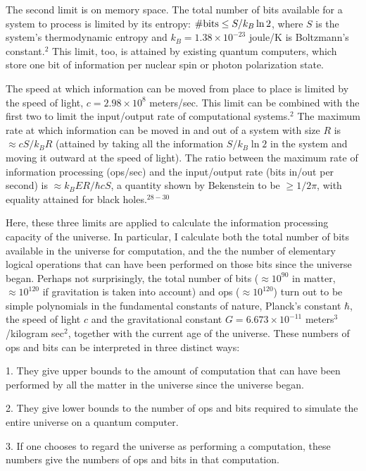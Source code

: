 The second limit is on memory space.  The total number of bits available 
for a system to process is limited by its entropy:
${\rm \# bits} \leq S/k_B \ln 2$, where $S$ is the system's
thermodynamic entropy and $k_B = 1.38 \times 10^{-23}$ joule/K
is Boltzmann's constant.$^2$  This limit, too, is attained by existing quantum
computers, which store one bit of information per nuclear spin or
photon polarization state.


The speed at which information can be moved from place to place
is limited by the speed of light, $c= 2.98 \times 10^8$ meters/sec.
This limit can be combined with the first two to limit the input/output
rate of computational systems.$^2$  The maximum rate at which information
can be moved in and out of a system with size $R$ is 
$\approx cS/k_B R$ (attained by taking all the information $S/k_B\ln2$ in the
system and moving it outward at the speed of light).  The ratio between
the maximum rate of information processing (ops/sec) and the
input/output rate (bits in/out per second) is $\approx k_B E R/ \hbar c S$,
a quantity shown by Bekenstein to be $\geq 1/2\pi$, with equality attained
for black holes.$^{28-30}$

Here, these three limits are applied to calculate the information processing
capacity of the universe.  In particular, I calculate both the total number
of bits available in the universe for computation, and the the number 
of elementary logical operations that can have been performed on those bits
since the universe began.  Perhaps not surprisingly, the total number of
bits ($ \approx 10^{90}$ in matter, $\approx 10^{120}$ if gravitation
is taken into account) and ops ($ \approx 10^{120}$) turn out to 
be simple polynomials in 
the fundamental constants of nature, Planck's constant $\hbar$, the speed 
of light $c$ and the gravitational constant $G=6.673 \times 10^{-11}$ 
meters$^3$/kilogram sec$^2$, together with the current age of the
universe.  These numbers of ops and bits can be interpreted in three
distinct ways:
\bigskip

\item{1.} They give upper bounds to the amount of computation
that can have been performed by all the matter in the universe since the
universe began.

\item{2.} They give lower bounds to the number of ops and
bits required to simulate the entire universe on a quantum computer.

\item{3.} If one chooses to regard the universe as performing
a computation, these numbers give the numbers of ops and bits in that
computation.

